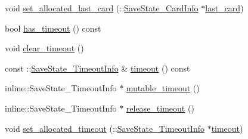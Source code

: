 \begin{DoxyCompactItemize}
\item 
void \hyperlink{class_save_state_a1ccf5ece5589b63cb730cbcee402d341}{set\-\_\-allocated\-\_\-last\-\_\-card} (\-::\hyperlink{class_save_state___card_info}{Save\-State\-\_\-\-Card\-Info} $\ast$\hyperlink{class_save_state_a5e8a964aec9672579514bea0b88ea9e1}{last\-\_\-card})
\item 
bool \hyperlink{class_save_state_a2f0862c53b24215363deea35fb18fb53}{has\-\_\-timeout} () const 
\item 
void \hyperlink{class_save_state_ae8d27bf3610103cf4ef2bd027ac0b0c5}{clear\-\_\-timeout} ()
\item 
const \-::\hyperlink{class_save_state___timeout_info}{Save\-State\-\_\-\-Timeout\-Info} \& \hyperlink{class_save_state_af2437be022b45617682c684e365925aa}{timeout} () const 
\item 
inline\-::\-Save\-State\-\_\-\-Timeout\-Info $\ast$ \hyperlink{class_save_state_af2a71152171602f5c81e9b83ec8b52b0}{mutable\-\_\-timeout} ()
\item 
inline\-::\-Save\-State\-\_\-\-Timeout\-Info $\ast$ \hyperlink{class_save_state_a5b1ff094683a6b392c3ea839acaba400}{release\-\_\-timeout} ()
\item 
void \hyperlink{class_save_state_a8759f21f21b1864473e7b30884e0f547}{set\-\_\-allocated\-\_\-timeout} (\-::\hyperlink{class_save_state___timeout_info}{Save\-State\-\_\-\-Timeout\-Info} $\ast$\hyperlink{class_save_state_af2437be022b45617682c684e365925aa}{timeout})
\end{DoxyCompactItemize}
